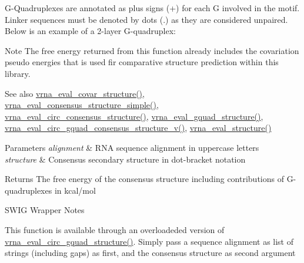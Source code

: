 G-\/\+Quadruplexes are annotated as plus signs (\textquotesingle{}+\textquotesingle{}) for each G involved in the motif. Linker sequences must be denoted by dots (\textquotesingle{}.\textquotesingle{}) as they are considered unpaired. Below is an example of a 2-\/layer G-\/quadruplex\+: 
\begin{DoxyCode}{0}
\end{DoxyCode}


\begin{DoxyNote}{Note}
The free energy returned from this function already includes the covariation pseudo energies that is used fir comparative structure prediction within this library.
\end{DoxyNote}
\begin{DoxySeeAlso}{See also}
\mbox{\hyperlink{group__eval_ga6cea75c0eb9857fb59172be54cab09e0}{vrna\+\_\+eval\+\_\+covar\+\_\+structure()}}, \mbox{\hyperlink{group__eval_ga7762c3a7bdcbc3a14ef93259d322c7d6}{vrna\+\_\+eval\+\_\+consensus\+\_\+structure\+\_\+simple()}}, \mbox{\hyperlink{group__eval_gac96577cf232c71160f762737a994b7c6}{vrna\+\_\+eval\+\_\+circ\+\_\+consensus\+\_\+structure()}}, \mbox{\hyperlink{group__eval_ga3263504825ef4b523eba797c99921df4}{vrna\+\_\+eval\+\_\+gquad\+\_\+structure()}}, \mbox{\hyperlink{group__eval_gaecd3e17292a0b3927277434019a5e187}{vrna\+\_\+eval\+\_\+circ\+\_\+gquad\+\_\+consensus\+\_\+structure\+\_\+v()}}, \mbox{\hyperlink{group__eval_ga58f199f1438d794a265f3b27fc8ea631}{vrna\+\_\+eval\+\_\+structure()}}
\end{DoxySeeAlso}

\begin{DoxyParams}{Parameters}
{\em alignment} & R\+NA sequence alignment in uppercase letters \\
\hline
{\em structure} & Consensus secondary structure in dot-\/bracket notation \\
\hline
\end{DoxyParams}
\begin{DoxyReturn}{Returns}
The free energy of the consensus structure including contributions of G-\/quadruplexes in kcal/mol
\end{DoxyReturn}
\begin{DoxyRefDesc}{S\+W\+I\+G Wrapper Notes}
\item[\mbox{\hyperlink{wrappers__wrappers000060}{S\+W\+I\+G Wrapper Notes}}]This function is available through an overloadeded version of \mbox{\hyperlink{group__eval_ga9dba2fc5d7e6ad1359a7c2f350589c0e}{vrna\+\_\+eval\+\_\+circ\+\_\+gquad\+\_\+structure()}}. Simply pass a sequence alignment as list of strings (including gaps) as first, and the consensus structure as second argument \end{DoxyRefDesc}
\mbox{\label{group__eval_ga1c07851f6b665c3461a19e9e4eb33d26}} 
